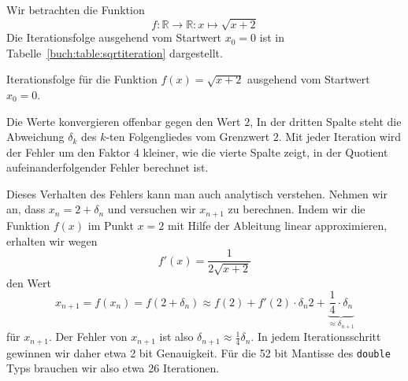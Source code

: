\begin{beispiel}
\label{section:beispiel:sqrtiteration}
Wir betrachten die Funktion 
\[
f\colon \mathbb{R}\to\mathbb{R} : x\mapsto \sqrt{x+2}
\]
Die Iterationsfolge ausgehend vom Startwert $x_0=0$ ist in
Tabelle~\ref{buch:table:sqrtiteration} dargestellt.
%

\begin{table}
\centering
\renewcommand\arraystretch{1.15}

\caption{Iterationsfolge für die Funktion $f(x)=\sqrt{x+2}$ ausgehend
vom Startwert $x_0=0$.
\label{buch:table:sqrtiteration}}
\end{table}

Die Werte konvergieren offenbar gegen den Wert $2$, 
In der dritten Spalte steht die Abweichung $\delta_k$ des $k$-ten Folgengliedes
vom Grenzwert $2$.
Mit jeder Iteration wird der Fehler um den Faktor 4 kleiner, wie die
vierte Spalte zeigt, in der Quotient aufeinanderfolgender Fehler
berechnet ist.

Dieses Verhalten des Fehlers kann man auch analytisch verstehen.
Nehmen wir an, dass $x_n = 2 + \delta_n$ und versuchen wir 
$x_{n+1}$ zu berechnen.
Indem wir die Funktion $f(x)$ im Punkt $x=2$ mit Hilfe der Ableitung
linear approximieren, erhalten wir wegen
\[
f'(x) = \frac{1}{2\sqrt{x+2}}
\]
den Wert
\[
x_{n+1} = f(x_n) = f(2 + \delta_n)
\approx
f(2) + f'(2)\cdot \delta_n
2 + \underbrace{\frac14\cdot \delta_n}_{\displaystyle\approx\delta_{n+1}}
\]
für $x_{n+1}$.
Der Fehler von $x_{n+1}$ ist also $\delta_{n+1}\approx\frac14\delta_n$.
In jedem Iterationsschritt gewinnen wir daher etwa 2 bit Genauigkeit.
Für die 52 bit Mantisse des \texttt{double} Typs brauchen wir also
etwa 26 Iterationen.
\end{beispiel}

